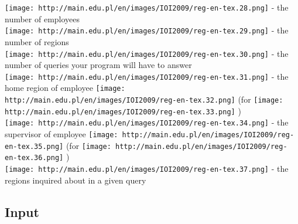 \texttt{[image: http://main.edu.pl/en/images/IOI2009/reg-en-tex.28.png]}   - the number of employees   
\\
\texttt{[image: http://main.edu.pl/en/images/IOI2009/reg-en-tex.29.png]}   - the number of regions   
\\
\texttt{[image: http://main.edu.pl/en/images/IOI2009/reg-en-tex.30.png]}   - the number of queries your program will have to answer   
\\
\texttt{[image: http://main.edu.pl/en/images/IOI2009/reg-en-tex.31.png]}   - the home region of employee   
\texttt{[image: http://main.edu.pl/en/images/IOI2009/reg-en-tex.32.png]}   (for   
\texttt{[image: http://main.edu.pl/en/images/IOI2009/reg-en-tex.33.png]}   )   
\\
\texttt{[image: http://main.edu.pl/en/images/IOI2009/reg-en-tex.34.png]}   - the supervisor of employee   
\texttt{[image: http://main.edu.pl/en/images/IOI2009/reg-en-tex.35.png]}   (for   
\texttt{[image: http://main.edu.pl/en/images/IOI2009/reg-en-tex.36.png]}   )   
\\
\texttt{[image: http://main.edu.pl/en/images/IOI2009/reg-en-tex.37.png]}   - the regions inquired about in a given query  

\subsection{   Input  }

